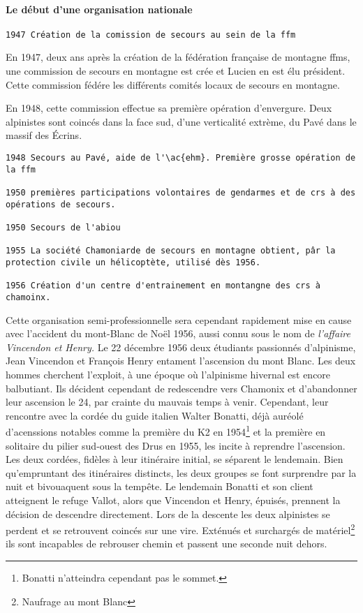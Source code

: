 \paragraph{Le début d'une organisation nationale}

\begin{verbatim}
1947 Création de la comission de secours au sein de la ffm
\end{verbatim}


En 1947, deux ans après la création de la fédération française de
montagne \acp{ffm}, une commission de secours en montagne est crée et
Lucien  en est élu président. Cette commission fédére les
différents comités locaux de secours en montagne.

En 1948, cette commission effectue sa première opération
d'envergure. Deux alpinistes sont coincés dans la face sud, d'une
verticalité extrème, du Pavé dans le massif des Écrins. 

\begin{verbatim}
1948 Secours au Pavé, aide de l'\ac{ehm}. Première grosse opération de la ffm

1950 premières participations volontaires de gendarmes et de crs à des
opérations de secours.

1950 Secours de l'abiou

1955 La société Chamoniarde de secours en montagne obtient, pâr la
protection civile un hélicoptète, utilisé dès 1956.

1956 Création d'un centre d'entrainement en montangne des crs à
chamoinx.
\end{verbatim}

Cette organisation semi-professionnelle sera cependant rapidement mise
en cause avec l'accident du mont-Blanc de Noël 1956, aussi connu sous
le nom de \emph{l'affaire Vincendon et Henry.} Le 22 décembre 1956
deux étudiants passionnés d'alpinisme, Jean Vincendon et François
Henry entament l’ascension du mont Blanc. Les deux hommes cherchent
l'exploit, à une époque où l'alpinisme hivernal est encore
balbutiant. Ils décident cependant de redescendre vers Chamonix et
d'abandonner leur ascension le 24, par crainte du mauvais temps à
venir. Cependant, leur rencontre avec la cordée du guide italien
Walter Bonatti, déjà auréolé d'acenssions notables comme la première
du K2 en 1954\footnote{Bonatti n'atteindra cependant pas le sommet.}
et la première en solitaire du pilier sud-ouest des Drus en 1955, les
incite à reprendre l’ascension. Les deux cordées, fidèles à leur
itinéraire initial, se séparent le lendemain. Bien qu'empruntant des
itinéraires distincts, les deux groupes se font surprendre par la nuit
et bivouaquent sous la tempête. Le lendemain Bonatti et son client
atteignent le refuge Vallot, alors que Vincendon et Henry, épuisés,
prennent la décision de descendre directement. Lors de la descente les
deux alpinistes se perdent et se retrouvent coincés sur une
vire. Exténués et surchargés de matériel\footnote{Naufrage au mont
  Blanc} ils sont incapables de rebrouser chemin et passent une
seconde nuit dehors.

